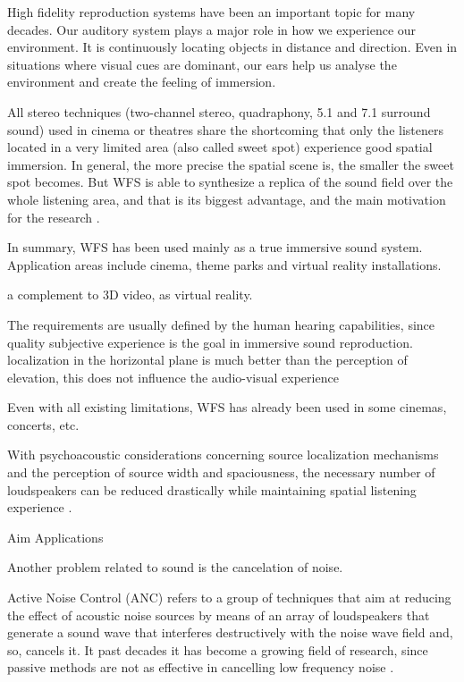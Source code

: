 High fidelity reproduction systems have been an important topic for many decades. Our auditory system plays a major role in how we experience our environment. It is continuously locating objects in distance and direction. Even in situations where visual cues are dominant, our ears help us analyse the environment and create the feeling of immersion.

All stereo techniques (two-channel stereo, quadraphony, 5.1 and 7.1 surround sound) used in cinema or theatres share the shortcoming that only the listeners located in a very limited area (also called sweet spot) experience good spatial immersion. In general, the more precise the spatial scene is, the smaller the sweet spot becomes. But WFS is able to synthesize a replica of the sound field over the whole listening area, and that is its biggest advantage, and the main motivation for the research \cite{Brandenburg2009}.

In summary, WFS has been used mainly as a true immersive sound system. Application areas include cinema, theme parks and virtual reality installations.



a complement to 3D video, as virtual reality.

The requirements are usually defined by the human hearing capabilities, since quality subjective experience is the goal in immersive sound reproduction.
localization in the horizontal plane is much better than the perception of elevation, this does not influence the audio-visual experience \cite{Brandenburg2009}

Even with all existing limitations, WFS has already been used in some cinemas, concerts, etc.



With psychoacoustic considerations concerning source localization mechanisms and the perception of source width and spaciousness, the necessary number of loudspeakers can be reduced drastically while maintaining spatial listening experience \cite{Musicology}.



Aim
Applications




Another problem related to sound is the cancelation of noise. 

Active Noise Control (ANC) refers to a group of techniques that aim at reducing the effect of acoustic noise sources by means of an array of loudspeakers that generate a sound wave that interferes destructively with the noise wave field and, so, cancels it. It past decades it has become a growing field of research, since passive methods are not as effective in cancelling low frequency noise \cite{Lapini2016}.

